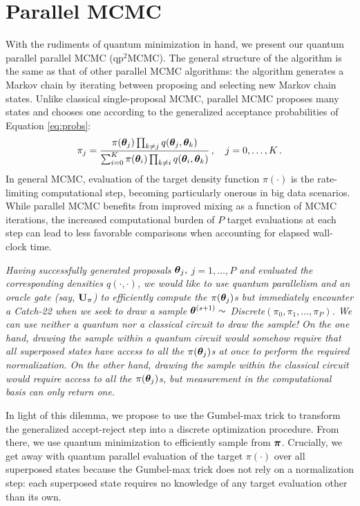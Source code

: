 \documentclass[12pt]{article} %
\begin{document}
\section{Parallel MCMC}

With the rudiments of quantum minimization in hand, we present our quantum parallel parallel MCMC (qp$^2$MCMC). The general structure of the algorithm is the same as that of other parallel MCMC algorithms: the algorithm generates a Markov chain by iterating between proposing and selecting new Markov chain states.  Unlike classical single-proposal MCMC, parallel MCMC proposes many states and chooses one according to the generalized acceptance probabilities of Equation \eqref{eq:probs}:
\begin{align*}
\pi_j = \frac{\pi(\boldsymbol{\theta}_j) \prod_{k \neq j} q(\boldsymbol{\theta}_j,\boldsymbol{\theta}_k)}{\sum_{i=0}^K \pi(\boldsymbol{\theta}_i) \prod_{k \neq i} q(\boldsymbol{\theta}_i,\boldsymbol{\theta}_k)} \, , \quad j=0,\dots,K \, .
\end{align*}
 In general MCMC, evaluation of the target density function $\pi(\cdot)$ is the rate-limiting computational step, becoming particularly onerous in big data scenarios.  While parallel MCMC benefits from improved mixing as a function of MCMC iterations, the increased computational burden of $P$ target evaluations at each step can lead to less favorable comparisons when accounting for elapsed wall-clock time.
 
 \emph{Having successfully generated proposals $\boldsymbol{\theta}_j,$ $j=1,\dots,P$ and evaluated the corresponding densities $q(\cdot,\cdot)$, we would like to use quantum parallelism and an oracle gate (say, $\mathbf{U}_\pi$) to efficiently compute the $\pi(\boldsymbol{\theta}_j)$s but immediately encounter a Catch-22 when we seek to draw a sample $\boldsymbol{\theta}^{(s+1)} \sim$ \emph{Discrete}$(\pi_0,\pi_1,\dots,\pi_P)$.  We can use neither a quantum nor a classical circuit to draw the sample! On the one hand, drawing the sample within a quantum circuit would somehow require that all superposed states have access to all the $\pi(\boldsymbol{\theta}_j)$s at once to perform the required normalization.  On the other hand, drawing the sample within the classical circuit would require access to all the $\pi(\boldsymbol{\theta}_j)$s, but measurement in the computational basis can only return one.}  
 
 In light of this dilemma, we propose to use the Gumbel-max trick to transform the generalized accept-reject step into a discrete optimization procedure.  From there, we use quantum minimization to efficiently sample from $\boldsymbol{\pi}$. Crucially, we get away with quantum parallel evaluation of the target $\pi(\cdot)$ over all superposed states because the Gumbel-max trick does not rely on a normalization step: each superposed state requires no knowledge of any target evaluation other than its own.  
 
\end{document}
